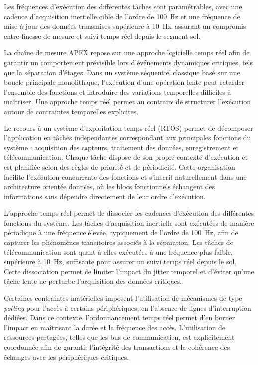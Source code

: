 Les fréquences d’exécution des différentes tâches sont paramétrables, avec une cadence d’acquisition inertielle cible de l’ordre
de 100~Hz et une fréquence de mise à jour des données transmises supérieure à 10~Hz, assurant un compromis entre finesse de
mesure et suivi temps réel depuis le segment sol.


La chaîne de mesure APEX repose sur une approche logicielle temps réel afin de garantir un comportement
prévisible lors d’événements dynamiques critiques, tels que la séparation d’étages. Dans un système
séquentiel classique basé sur une boucle principale monolithique, l’exécution d’une opération lente peut
retarder l’ensemble des fonctions et introduire des variations temporelles difficiles à maîtriser. Une
approche temps réel permet au contraire de structurer l’exécution autour de contraintes temporelles
explicites.

Le recours à un système d’exploitation temps réel (RTOS) permet de décomposer l’application en tâches
indépendantes correspondant aux principales fonctions du système : acquisition des capteurs,
traitement des données, enregistrement et télécommunication. Chaque tâche dispose de son propre
contexte d’exécution et est planifiée selon des règles de priorité et de périodicité. Cette organisation
facilite l’exécution concurrente des fonctions et s’inscrit naturellement dans une architecture orientée
données, où les blocs fonctionnels échangent des informations sans dépendre directement de leur ordre
d’exécution.

L’approche temps réel permet de dissocier les cadences d’exécution des différentes fonctions du système.
Les tâches d’acquisition inertielle sont exécutées de manière périodique à une fréquence élevée,
typiquement de l’ordre de 100~Hz, afin de capturer les phénomènes transitoires associés à la séparation.
Les tâches de télécommunication sont quant à elles exécutées à une fréquence plus faible, supérieure à
10~Hz, suffisante pour assurer un suivi temps réel depuis le sol. Cette dissociation permet de limiter
l’impact du jitter temporel et d’éviter qu’une tâche lente ne perturbe l’acquisition des données critiques.

Certaines contraintes matérielles imposent l’utilisation de mécanismes de type \emph{polling} pour l’accès
à certains périphériques, en l’absence de lignes d’interruption dédiées. Dans ce contexte, l’ordonnancement
temps réel permet d’en borner l’impact en maîtrisant la durée et la fréquence des accès. L’utilisation de
ressources partagées, telles que les bus de communication, est explicitement coordonnée afin de garantir
l’intégrité des transactions et la cohérence des échanges avec les périphériques critiques.

